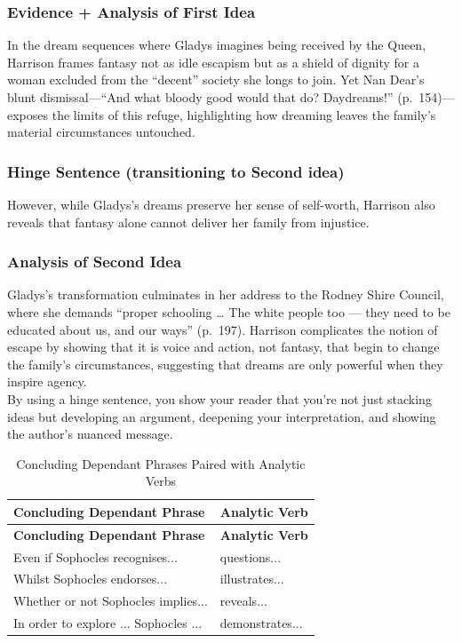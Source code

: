 \documentclass[a4paper]{article}
\begin{document}
\subsubsection{Evidence + Analysis of First Idea}
In the dream sequences where Gladys imagines being received by the Queen, Harrison frames fantasy not as idle escapism but as a shield of dignity for a woman excluded from the ``decent'' society she longs to join. Yet Nan Dear’s blunt dismissal—``And what bloody good would that do? Daydreams!'' (p.~154)—exposes the limits of this refuge, highlighting how dreaming leaves the family’s material circumstances untouched.\\

\subsubsection{Hinge Sentence (transitioning to Second idea)}
However, while Gladys’s dreams preserve her sense of self-worth, Harrison also reveals that fantasy alone cannot deliver her family from injustice.

\subsubsection{ Analysis of Second Idea}
Gladys’s transformation culminates in her address to the Rodney Shire Council, where she demands ``proper schooling … The white people too — they need to be educated about us, and our ways'' (p.~197). Harrison complicates the notion of escape by showing that it is voice and action, not fantasy, that begin to change the family’s circumstances, suggesting that dreams are only powerful when they inspire agency.\\

By using a hinge sentence, you show your reader that you're not just stacking ideas but developing an argument, deepening your interpretation, and showing the author’s nuanced message.\\
\begin{longtable}{|p{9cm}|p{6.5cm}|}
\caption{Concluding Dependant Phrases Paired with Analytic Verbs} \label{tab:concludingphrases} \\
\hline
\textbf{Concluding Dependant Phrase} & \textbf{Analytic Verb} \\
\hline
\endfirsthead

\hline
\textbf{Concluding Dependant Phrase} & \textbf{Analytic Verb} \\
\hline
\endhead

\hline
\endfoot

Even if Sophocles recognises...         & questions... \\
Whilst Sophocles endorses...            & illustrates... \\
Whether or not Sophocles implies...     & reveals... \\
In order to explore ... Sophocles ...   & demonstrates... \\
\hline

\end{longtable}
\end{document}

